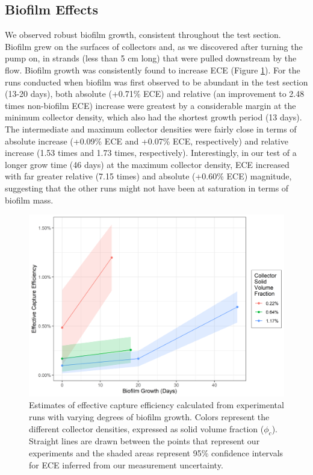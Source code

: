 \documentclass[geosciences,article,submit,moreauthors,pdftex]{Definitions/mdpi}
\begin{document}
\subsection{Biofilm Effects}

We observed robust biofilm growth, consistent throughout the test section. Biofilm grew on the surfaces of collectors and, as we discovered after turning the pump on, in strands (less than 5 cm long) that were pulled downstream by the flow. Biofilm growth was consistently found to increase ECE (Figure \ref{fig:biofilm}). For the runs conducted when biofilm was first observed to be abundant in the test section (13-20 days), both absolute (+0.71\% ECE) and relative (an improvement to 2.48 times non-biofilm ECE) increase were greatest by a considerable margin at the minimum collector density, which also had the shortest growth period (13 days). The intermediate and maximum collector densities were fairly close in terms of absolute increase (+0.09\% ECE and +0.07\% ECE, respectively) and relative increase (1.53 times and 1.73 times, respectively). Interestingly, in our test of a longer grow time (46 days) at the maximum collector density, ECE increased with far greater relative (7.15 times) and absolute (+0.60\% ECE) magnitude, suggesting that the other runs might not have been at saturation in terms of biofilm mass.

\begin{figure}[H]
\centering
\includegraphics[width=5in]{../pics/biofilm.png}
\caption{Estimates of effective capture efficiency calculated from experimental runs with varying degrees of biofilm growth. Colors represent the different collector densities, expressed as solid volume fraction ($\phi_c$). Straight lines are drawn between the points that represent our experiments and the shaded areas represent 95\% confidence intervals for ECE inferred from our measurement uncertainty.}
\label{fig:biofilm}
\end{figure}   
\end{document}
